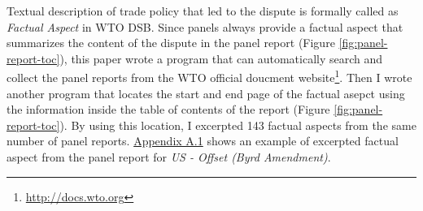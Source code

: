 Textual description of trade policy that 
led to the dispute is formally called as
\textit{Factual Aspect} in WTO DSB. 
Since panels
always provide a factual aspect
that summarizes the content of the dispute
in the panel report (Figure \ref{fig:panel-report-toc}),
this paper wrote a program that can 
automatically search and collect 
the panel reports from the WTO official doucment website\footnote{
    \url{http://docs.wto.org}
}.
Then I wrote another program that locates the start 
and end page of the factual asepct using the information inside the 
table of contents of the report (Figure \ref{fig:panel-report-toc}).
By using this location, I excerpted 143 factual aspects 
from the same number of panel reports. 
\hyperref[sub:factual-aspect-example]{Appendix A.1} shows an
example of excerpted factual aspect from the panel report for \textit{US - Offset (Byrd Amendment)}.




